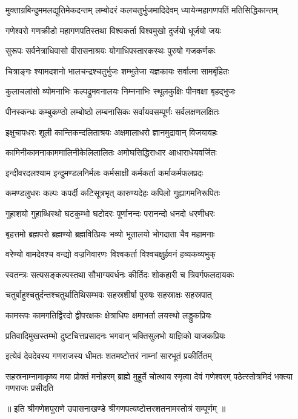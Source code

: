 
{मुक्ताग्रबिन्दुममलद्युतिमेकदन्तम्}
{लम्बोदरं कलचतुर्भुजमादिदेवम्}
{ध्यायेन्महागणपतिं मतिसिद्धिकान्तम्}

\twolineshloka
{गणेश्वरो गणक्रीडो महागणपतिस्तथा}
{विश्वकर्ता विश्वमुखो दुर्जयो धूर्जयो जयः}

\twolineshloka
{सुरूपः सर्वनेत्राधिवासो वीरासनाश्रयः}
{योगाधिपस्तारकस्थः पुरुषो गजकर्णकः}

\twolineshloka
{चित्राङ्गः श्यामदशनो भालचन्द्रश्चतुर्भुजः}
{शम्भुतेजा यज्ञकायः सर्वात्मा सामबृंहितः}

\twolineshloka
{कुलाचलांसो व्योमनाभिः कल्पद्रुमवनालयः}
{निम्ननाभिः स्थूलकुक्षिः पीनवक्षा बृहद्भुजः}

\twolineshloka
{पीनस्कन्धः कम्बुकण्ठो लम्बोष्ठो लम्बनासिकः}
{सर्वायवसम्पूर्णः सर्वलक्षणलक्षितः}

\twolineshloka
{इक्षुचापधरः शूली कान्तिकन्दलिताश्रयः}
{अक्षमालाधरो ज्ञानमुद्रावान् विजयावहः}

\twolineshloka
{कामिनीकामनाकाममालिनीकेलिलालितः}
{अमोघसिद्धिराधार आधाराधेयवर्जितः}

\twolineshloka
{इन्दीवरदलश्याम इन्दुमण्डलनिर्मलः}
{कर्मसाक्षी कर्मकर्ता कर्माकर्मफलप्रदः}

\twolineshloka
{कमण्डलुधरः कल्पः कपर्दी कटिसूत्रभृत्}
{कारुण्यदेहः कपिलो गुह्यागमनिरूपितः}

\twolineshloka
{गुहाशयो गुहाब्धिस्थो घटकुम्भो घटोदरः}
{पूर्णानन्दः परानन्दो धनदो धरणीधरः}

\twolineshloka
{बृहत्तमो ब्रह्मपरो ब्रह्मण्यो ब्रह्मवित्प्रियः}
{भव्यो भूतालयो भोगदाता चैव महामनाः}

\twolineshloka
{वरेण्यो वामदेवश्च वन्द्यो वज्रनिवारणः}
{विश्वकर्ता विश्वचक्षुर्हवनं हव्यकव्यभुक्}

\twolineshloka
{स्वतन्त्रः सत्यसङ्कल्पस्तथा सौभाग्यवर्धनः}
{कीर्तिदः शोकहारी च त्रिवर्गफलदायकः}

\twolineshloka
{चतुर्बाहुश्चतुर्दन्तश्चतुर्थातिथिसम्भवः}
{सहस्रशीर्षा पुरुषः सहस्राक्षः सहस्रपात्}

\twolineshloka
{कामरूपः कामगतिर्द्विरदो द्वीपरक्षकः}
{क्षेत्राधिपः क्षमाभर्ता लयस्थो लड्डुकप्रियः}

\twolineshloka
{प्रतिवादिमुखस्तम्भो दुष्टचित्तप्रसादनः}
{भगवान् भक्तिसुलभो याज्ञिको याजकप्रियः}

\twolineshloka
{इत्येवं देवदेवस्य गणराजस्य धीमतः}
{शतमष्टोत्तरं नाम्नां सारभूतं प्रकीर्तितम्}

\threelineshloka
{सहस्रनाम्नामाकृष्य मया प्रोक्तं मनोहरम्}
{ब्राह्मे मुहूर्ते चोत्थाय स्मृत्वा देवं गणेश्वरम्}
{पठेत्स्तोत्रमिदं भक्त्या गणराजः प्रसीदति}

{॥ इति श्रीगणेशपुराणे उपासनाखण्डे श्रीगणपत्यष्टोत्तरशतनामस्तोत्रं सम्पूर्णम् ॥}
